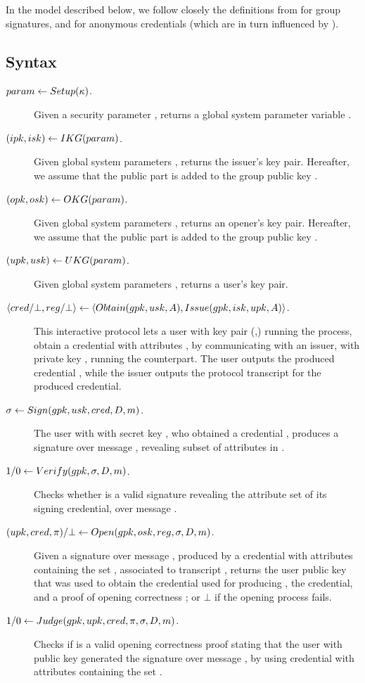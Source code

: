 In the model described below, we follow closely the definitions from
\cite{bsz05} for group signatures, and \cite{fhs19} for anonymous credentials
(which are in turn influenced by \cite{bsz05}).

\subsection{Syntax}
\label{ssec:syntax}

\begin{description}
\item[$param \gets Setup(\kappa)$.] Given a security parameter \secpar,
  returns a global system parameter variable \parm.
\item[$(ipk,isk) \gets IKG(param)$.] Given global system parameters
  \parm, returns the issuer's key pair. Hereafter, we assume that the public
  part \ipk is added to the group public key \gpk.
\item[$(opk,osk) \gets OKG(param)$.] Given global system parameters
  \parm, returns an opener's key pair. Hereafter, we assume that the public part
  \opk is added to the group public key \gpk.
\item[$(upk,usk) \gets UKG(param)$.] Given global system parameters
  \parm, returns a user's key pair.
\item[$\langle cred/\bot,reg/\bot \rangle \gets
  \langle Obtain(gpk,usk,A),Issue(gpk,isk,upk,A) \rangle$.]
  This interactive protocol lets a user with key pair (\upk,\usk) running the
  \Obtain process, obtain a credential \cred with attributes \Attrs, by
  communicating with an issuer, with private key \isk, running the \Issue
  counterpart. The user outputs the produced credential \cred, while the issuer
  outputs the protocol transcript \utrans for the produced credential.
\item[$\sigma \gets Sign(gpk,usk,cred,D,m)$.] The user with
  with secret key \usk, who obtained a credential \cred, produces a signature
  \sig over message \msg, revealing subset of attributes \DAttrs in \cred.
\item[$1/0 \gets Verify(gpk,\sigma,D,m)$.] Checks whether \sig is a
  valid signature revealing the attribute set \DAttrs of its signing credential,
  over message \msg.
\item[$(upk,cred,\pi)/\bot \gets
  Open(gpk,osk,reg,\sigma,D,m)$.]
  Given a signature \sig over message \msg, produced by a credential with
  attributes containing the set \DAttrs, associated to transcript \utrans,
  returns the user public key that was used to obtain the credential used for
  producing \sig, the credential, and a proof of opening correctness \oproof; or
  $\bot$ if the opening process fails.  
\item[$1/0 \gets Judge(gpk,upk,cred,\pi,\sigma,D,m)$.] Checks if
  \oproof is a valid opening correctness proof stating that the user with public
  key \upk generated the signature \sig over message \msg, by using credential
  \cred with attributes containing the set \DAttrs. 
\end{description}

